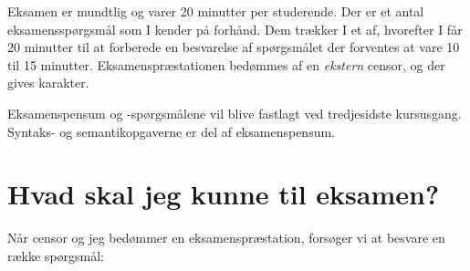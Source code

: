 \documentclass[11pt,a4paper,article,oneside]{memoir}
\begin{document}
Eksamen er mundtlig og varer 20 minutter per studerende. Der er et antal
eksamensspørgsmål som I kender på forhånd. Dem trækker I et af, hvorefter
I får 20 minutter til at forberede en besvarelse af spørgsmålet der
forventes at vare 10 til 15 minutter. Eksamenspræstationen bedømmes af en
\emph{ekstern} censor, og der gives karakter.

Eksamenspensum og -spørgsmålene vil blive fastlagt ved tredjesidste
kursusgang.  Syntaks- og semantikopgaverne er del af eksamenspensum.
 
\section{Hvad skal jeg kunne til eksamen?} 
 
Når censor og jeg bedømmer en eksamenspræstation, forsøger vi at besvare
en række spørgsmål:
\end{document}
